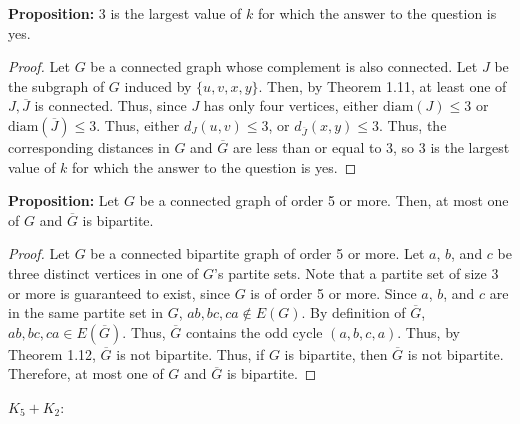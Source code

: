 \documentclass[12pt]{article}
\begin{document}
\medskip
{\bf Proposition:} 3 is the largest value of $k$ for which the answer to the question is yes.
\begin{proof}
    Let $G$ be a connected graph whose complement is also connected.
    Let $J$ be the subgraph of $G$ induced by $\{u,v,x,y\}$.
    Then, by Theorem 1.11, at least one of $J, \overline J$ is connected.
    Thus, since $J$ has only four vertices, either $\text{diam}(J) \leq 3$ or $\text{diam}(\overline J) \leq 3$.
    Thus, either $d_J(u,v) \leq3$, or $d_{\overline J}(x,y) \leq 3$.
    Thus, the corresponding distances in $G$ and $\overline G$ are less than or equal to 3, so 3 is the largest value of $k$ for which the answer to the question is yes.
\end{proof}

\bigskip
{}

{\bf Proposition:} Let $G$ be a connected graph of order 5 or more. Then, at most one of $G$ and $\overline G$ is bipartite.
\begin{proof}
    Let $G$ be a connected bipartite graph of order 5 or more.
    Let $a$, $b$, and $c$ be three distinct vertices in one of $G$'s partite sets.
    Note that a partite set of size 3 or more is guaranteed to exist, since $G$ is of order 5 or more.
    Since $a$, $b$, and $c$ are in the same partite set in $G$, $ab, bc, ca \notin E(G)$.
    By definition of $\overline{G}$, $ab,bc,ca\in E(\overline{G})$.
    Thus, $\overline G$ contains the odd cycle $(a,b,c,a)$.
    Thus, by Theorem 1.12, $\overline{G}$ is not bipartite.
    Thus, if $G$ is bipartite, then $\overline G$ is not bipartite.
    Therefore, at most one of $G$ and $\overline G$ is bipartite.
\end{proof}

\bigskip
{}

 $K_5 + K_2:$
\end{document}

